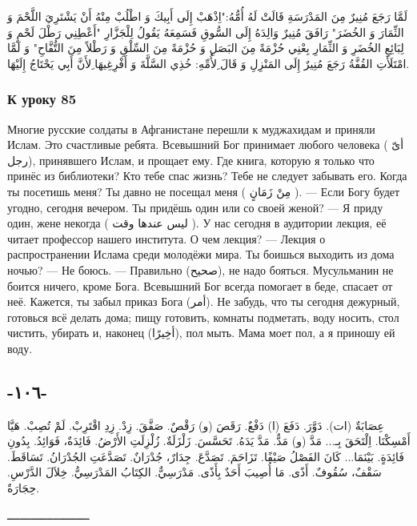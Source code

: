 \documentclass[a5paper]{article}
\begin{document}
لَمَّا رَجَعَ مُنِيرٌ مِنَ المَدْرَسَةِ قَالَتْ لَهُ أُمُّهُ:"اِذْهَبْ إِلَى أَبِيكَ وَ اطْلُبْ مِنْهُ أَنْ يَشْتَرِيَ اللَّحْمَ وَ الثِّمَارَ وَ الخُضَرَ" رَافَقَ مُنِيرٌ وَالِدَهُ إِلَى السُّوقِ فَسَمِعَهُ يَقُولُ لِلْجَزَّارِ "أَعْطِنِي رَطْلَ لَحْمٍ وَ لِبَائِعِ الخُضَرِ وَ الثِّمَارِ بِعْنِي حُزْمَةً مِنَ البَصَلِ وَ حُزْمَةً مِنَ السِّلْقِ وَ رَطْلاً مِنَ التُّفَّاحِ" وَ لَمَّا امْتَلَأَتِ القُفَّةُ رَجَعَ مُنِيرٌ إِلَى المَنْزِلِ وَ قَالَ ِلأُمِّهِ: خُذِي السَّلَّةَ وَ أَفْرِغِيهَا ِلأَنَّ أَبِي يَحْتَاجُ إِلَيْهَا.

\subsubsection{К уроку 85}
Многие русские солдаты в Афганистане перешли к муджахидам и приняли Ислам. Это счастливые ребята. Всевышний Бог принимает любого человека ( أىّ رجل), принявшего Ислам, и прощает ему. Где книга, которую я только что принёс из библиотеки? Кто тебе спас жизнь? Тебе не следует забывать его. Когда ты посетишь меня? Ты давно не посещал меня ( مِنْ زَمَانٍ ). — Если Богу будет угодно, сегодня вечером. Ты придёшь один или со своей женой? — Я приду один, жене некогда ( ليس عندها وقت ). У нас сегодня в аудитории лекция, её читает профессор нашего института. О чем лекция? — Лекция о распространении Ислама среди молодёжи мира. Ты боишься выходить из дома ночью? — Не боюсь. — Правильно (صحيح), не надо бояться. Мусульманин не боится ничего, кроме Бога. Всевышний Бог всегда помогает в беде, спасает от неё. Кажется, ты забыл приказ Бога (أمر). Не забудь, что ты сегодня дежурный, готовься всё делать дома; пищу готовить, комнаты подметать, воду носить, стол чистить, убирать и, наконец (أخِيرًا), пол мыть. Мама моет пол, а я приношу ей воду.

\subsection{-١٠٦-}
عِصَابَةٌ (ات). دَوَّرَ. دَفَعَ (ا) دَفْعٌ. رَقَصَ (و) رَقْصٌ. صَفَّقَ. زِدْ. زِدِ اقْتَرِبْ. لَمْ تُصِبْ. هَيَّا أَمْسِكْنَا. اِلْتَحَقَ بِـ... مَدَّ (و) مَدٌّ. مَدَّ يَدَهُ. تَحَسَّسَ. زَلْزَلَةٌ. زُلْزِلَتِ الأَرْضُ. فَائِدَةٌ، فَوَائِدُ. بِدُونِ فَائِدَةٍ. بَيْنَمَا... كَانَ الفَصْلُ صَيْفًا. تَزَاحَمَ. تَصَدَّعَ. جِدَارٌ، جُدْرَانٌ. تَصَدَّعَتِ الجُدْرَانُ. تَسَاقَطَ. سَقْفٌ، سُقُوفٌ. أَذًى. مَا أُصِيبَ أَحَدٌ بِأَذًى. مَدْرَسِيٌّ. الكِتَابُ المَدْرَسِيُّ. خِلاَلَ الدَّرْسِ. حِجَارَةٌ.

ـــــــــــــــــــــــــ
\end{document}
